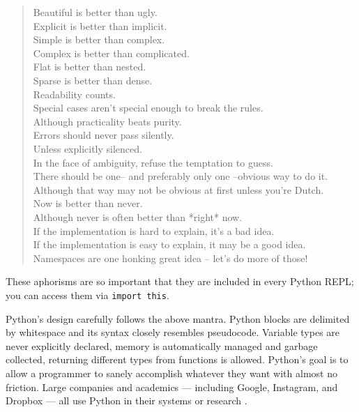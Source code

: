 \documentclass[12pt]{report}
\begin{document}
\begin{singlespace*}
\begin{quote}
    Beautiful is better than ugly. \\
    Explicit is better than implicit. \\
    Simple is better than complex. \\
    Complex is better than complicated. \\
    Flat is better than nested. \\
    Sparse is better than dense. \\
    Readability counts. \\
    Special cases aren't special enough to break the rules. \\
    Although practicality beats purity. \\
    Errors should never pass silently. \\
    Unless explicitly silenced. \\
    In the face of ambiguity, refuse the temptation to guess. \\
    There should be one-- and preferably only one --obvious way to do it. \\
    Although that way may not be obvious at first unless you're Dutch. \\
    Now is better than never. \\
    Although never is often better than *right* now. \\
    If the implementation is hard to explain, it's a bad idea. \\
    If the implementation is easy to explain, it may be a good idea. \\
    Namespaces are one honking great idea -- let's do more of those!
\end{quote}
\end{singlespace*}
These aphorisms are so important that they are included in every Python REPL; you can access them via \texttt{import this}.

Python's design carefully follows the above mantra. Python blocks are delimited by whitespace and its syntax closely resembles pseudocode. Variable types are never explicitly declared, memory is automatically managed and garbage collected, returning different types from functions is allowed. Python's goal is to allow a programmer to sanely accomplish whatever they want with almost no friction. Large companies and academics --- including Google, Instagram, and Dropbox --- all use Python in their systems or research \cite{python-quotes}.
\end{document}
